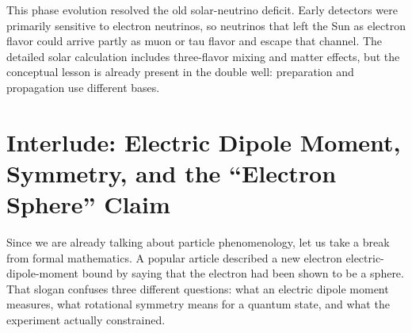 \begin{classroomqa}
\end{classroomqa}

\begin{classroomqa}
\end{classroomqa}

This phase evolution resolved the old solar-neutrino deficit. Early detectors were primarily sensitive to electron neutrinos, so neutrinos that left the Sun as electron flavor could arrive partly as muon or tau flavor and escape that channel. The detailed solar calculation includes three-flavor mixing and matter effects, but the conceptual lesson is already present in the double well: preparation and propagation use different bases.

\section{Interlude: Electric Dipole Moment, Symmetry, and the ``Electron Sphere'' Claim}

Since we are already talking about particle phenomenology, let us take a break from formal mathematics. A popular article described a new electron electric-dipole-moment bound by saying that the electron had been shown to be a sphere. That slogan confuses three different questions: what an electric dipole moment measures, what rotational symmetry means for a quantum state, and what the experiment actually constrained.

